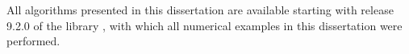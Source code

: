 
All algorithms presented in this dissertation are available starting with release 9.2.0 of the \dealii{} library \parencite{arndt2020,dealii920}, with which all numerical examples in this dissertation were performed.
